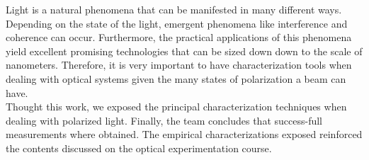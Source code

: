 Light is a natural phenomena that can be manifested in many different ways. Depending on the state of the light, emergent phenomena like interference and coherence can occur. Furthermore, the practical applications of this phenomena yield excellent promising technologies that can be sized down down to the scale of nanometers. Therefore, it is very important to have characterization tools when dealing with optical systems given the many states of polarization a beam can have.\\


Thought this work, we exposed the principal characterization techniques when dealing with polarized light. Finally, the team concludes that  success-full measurements where obtained. The empirical characterizations exposed reinforced the contents discussed on the optical experimentation course. 